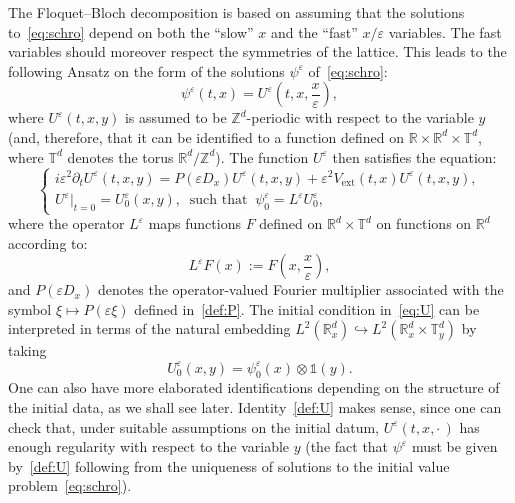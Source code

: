 \documentclass[AHL,Unicode,longabstracts]{cedram}
\DeclareMathOperator{\ext}{ext}
\newcommand*\R{{\mathbb R}}
\newcommand*\Z{{\mathbb Z}}
\newcommand*\T{{\mathbb T}}
\newcommand*\eps{\varepsilon}
\numberwithin{equation}{section}
\begin{document}
The Floquet--Bloch decomposition is based on assuming that the solutions to~\eqref{eq:schro} depend on both the ``slow'' $x$ and the ``fast'' $x/\eps$ variables. The fast variables should moreover respect the symmetries of the lattice. This leads to the following Ansatz on the form of the solutions $\psi^\eps$ of~\eqref{eq:schro}:
\begin{equation}\label{def:U}
\psi^\eps(t,x)=U^\eps\left(t,x,\frac{x}{\eps}\right),
\end{equation}
where $U^\eps(t,x,y)$ is assumed to be $\Z^d$-periodic with respect to the variable $y$ (and, therefore, that it can be identified to a function defined on $\R\times\R^d\times\T^d$, where $\T^d$ denotes the torus $\R^d \slash \mathbb{Z}^d$). The function $U^\eps$ then satisfies the equation:
\begin{equation}\label{eq:U}
\begin{cases}
i\eps^2\partial_tU^\eps (t,x,y)= P(\eps D_x) U^\eps (t,x,y) +\eps^2 V_{\ext}(t,x) U^\eps(t,x,y),\\
U^\eps|_{t=0}= U^\eps_0(x,y), \;\;\text{such that}\;\;\psi_{0}^{\eps}=L^\eps U^\eps_0,
\end{cases}
\end{equation}
where the operator $L^\eps$ maps functions $F$ defined on $\R^d\times \T^d$ on functions on $\R^d$ according to:
\begin{equation}\label{def:Leps}
L^\eps F(x):=F\left(x,\frac{x}{\eps}\right),
\end{equation}
and $P(\eps D_x)$ denotes the operator-valued Fourier multiplier associated with the symbol $\xi\mapsto P(\eps \xi)$ defined in~\eqref{def:P}. The initial condition in~\eqref{eq:U} can be interpreted in terms of the natural embedding $L^2(\R^d_x)\hookrightarrow L^2(\R^d_x\times \T^d_y)$ by taking
\[
U^\eps_0(x,y) = \psi^\eps_0(x) \otimes \mathds{1}(y).
\]
One can also have more elaborated identifications depending on the structure of the initial data, as we shall see later.
Identity~\eqref{def:U} makes sense, since one can check that, under suitable assumptions on the initial datum, $U^\eps(t,x,\cdot\,)$ has enough regularity with respect to the variable $y$ (the fact that $\psi^\eps$ must be given by~\eqref{def:U} following from the uniqueness of solutions to the initial value problem~\eqref{eq:schro}).


\end{document}
